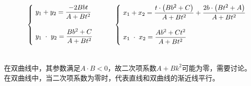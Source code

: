 \documentclass[UTF8]{ctexart}
\begin{document}
    \begin{large}
        \begin{equation*}
            ~~~~~~~~~~\begin{cases}
                ~y_1+y_2=\dfrac{-2Bbt}{A+Bt^2}\\[6mm]
                ~y_1\hspace{3.0pt}\cdot\hspace{3.0pt}y_2=\dfrac{Bb^2+C}{A+Bt^2}\\[2mm]
            \end{cases}~~~~~~
            \begin{cases}
                ~x_1+x_2=\dfrac{t\cdot\left(Bb^2+C\right)}{A+Bt^2}+\dfrac{2b\cdot\left(Bt^2+A\right)}{A+Bt^2}\\[6mm]
                ~x_1\hspace{3.0pt}\cdot\hspace{3.0pt}x_2=\dfrac{Ab^2+Ct^2}{A+Bt^2}\\[2mm]
            \end{cases}
        \end{equation*}
    \end{large}\\[3mm]
    在双曲线中，其参数满足$A\cdot B<0$，故二次项系数$A+Bk^2$可能为零，需要讨论。\\[3mm]
    在双曲线中，当二次项系数为零时，代表直线和双曲线的渐近线平行。
    
\newpage
\end{document}
